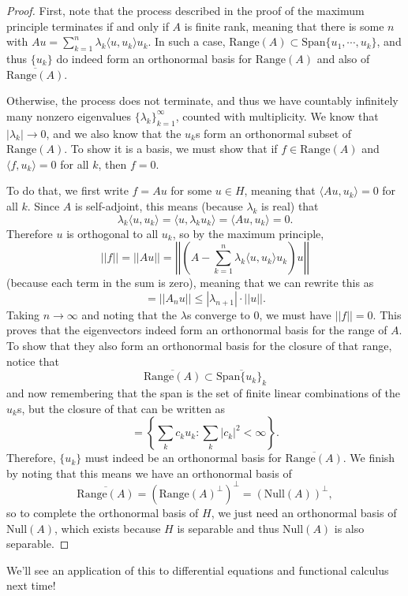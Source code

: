 \begin{proof}
First, note that the process described in the proof of the maximum principle terminates if and only if $A$ is finite rank, meaning that there is some $n$ with $Au = \sum_{k=1}^n \lambda_k \langle u, u_k \rangle u_k$. In such a case, $\text{Range}(A) \subset \text{Span}\{u_1, \cdots, u_k\}$, and thus $\{u_k\}$ do indeed form an orthonormal basis for $\text{Range}(A)$ and also of $\overline{\text{Range}(A)}$. 

Otherwise, the process does not terminate, and thus we have countably infinitely many nonzero eigenvalues $\{\lambda_k\}_{k=1}^{\infty}$, counted with multiplicity. We know that $|\lambda_k| \to 0$, and we also know that the $u_k$s form an orthonormal subset of $\text{Range}(A)$. To show it is a basis, we must show that if $f \in \text{Range}(A)$ and $\langle f, u_k \rangle = 0$ for all $k$, then $f = 0$. 

To do that, we first write $f = Au$ for some $u \in H$, meaning that $\langle Au, u_k \rangle = 0$ for all $k$. Since $A$ is self-adjoint, this means (because $\lambda_k$ is real) that
\[
    \lambda_k \langle u, u_k \rangle = \langle u, \lambda_k u_k \rangle = \langle Au, u_k \rangle = 0.
\]
Therefore $u$ is orthogonal to all $u_k$, so by the maximum principle, 
\[
    ||f|| = ||Au|| = \left|\left|\left(A - \sum_{k=1}^n \lambda_k \langle u, u_k \rangle u_k\right) u\right|\right|
\]
(because each term in the sum is zero), meaning that we can rewrite this as 
\[
    = ||A_nu|| \le |\lambda_{n+1}| \cdot ||u||.
\]
Taking $n \to \infty$ and noting that the $\lambda$s converge to $0$, we must have $||f|| = 0$. This proves that the eigenvectors indeed form an orthonormal basis for the range of $A$. To show that they also form an orthonormal basis for the closure of that range, notice that
\[
    \overline{\text{Range}(A)} \subset \overline{\text{Span}\{u_k\}_k}
\]
and now remembering that the span is the set of finite linear combinations of the $u_k$s, but the closure of that can be written as 
\[
    = \left\{\sum_k c_k u_k: \sum_k |c_k|^2 < \infty\right\}.
\]
Therefore, $\{u_k\}$ must indeed be an orthonormal basis for $\overline{\text{Range}(A)}$. We finish by noting that this means we have an orthonormal basis of 
\[
    \overline{\text{Range}(A)} = (\text{Range}(A)^\perp)^\perp = (\text{Null}(A))^\perp,
\]
so to complete the orthonormal basis of $H$, we just need an orthonormal basis of $\text{Null}(A)$, which exists because $H$ is separable and thus $\text{Null}(A)$ is also separable.
\end{proof}

We'll see an application of this to differential equations and functional calculus next time!